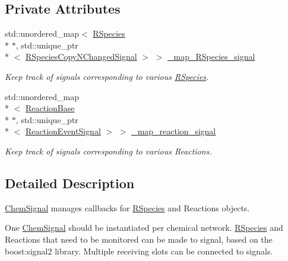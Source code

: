 \subsection*{Private Attributes}
\begin{DoxyCompactItemize}
\item 
std\-::unordered\-\_\-map$<$ \hyperlink{classchem_1_1RSpecies}{R\-Species} \\*
$\ast$, std\-::unique\-\_\-ptr\\*
$<$ \hyperlink{namespacechem_a6cb4144586460e7b7ae0dffdf08eb57c}{R\-Species\-Copy\-N\-Changed\-Signal} $>$ $>$ \hyperlink{classchem_1_1ChemSignal_a7721fb9395d65c7de08108163a3d4cdb}{\-\_\-map\-\_\-\-R\-Species\-\_\-signal}
\begin{DoxyCompactList}\small\item\em Keep track of signals corresponding to various \hyperlink{classchem_1_1RSpecies}{R\-Species}. \end{DoxyCompactList}\item 
std\-::unordered\-\_\-map\\*
$<$ \hyperlink{classchem_1_1ReactionBase}{Reaction\-Base} \\*
$\ast$, std\-::unique\-\_\-ptr\\*
$<$ \hyperlink{namespacechem_a40bfcc5c8ae87e2713c68fae68215991}{Reaction\-Event\-Signal} $>$ $>$ \hyperlink{classchem_1_1ChemSignal_a5a8fb8af001c1575256ee7b671c42ea3}{\-\_\-map\-\_\-reaction\-\_\-signal}
\begin{DoxyCompactList}\small\item\em Keep track of signals corresponding to various Reactions. \end{DoxyCompactList}\end{DoxyCompactItemize}


\subsection{Detailed Description}
\hyperlink{classchem_1_1ChemSignal}{Chem\-Signal} manages callbacks for \hyperlink{classchem_1_1RSpecies}{R\-Species} and Reactions objects. 

One \hyperlink{classchem_1_1ChemSignal}{Chem\-Signal} should be instantiated per chemical network. \hyperlink{classchem_1_1RSpecies}{R\-Species} and Reactions that need to be monitored can be made to signal, based on the boost\-:signal2 library. Multiple receiving slots can be connected to signals.

